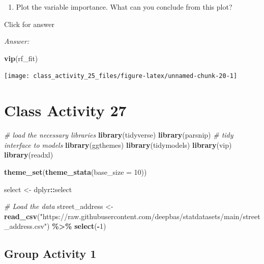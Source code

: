 \documentclass[
]{book}
\newenvironment{Shaded}{\begin{snugshade}}{\end{snugshade}}
\newcommand{\AttributeTok}[1]{\textcolor[rgb]{0.13,0.29,0.53}{#1}}
\newcommand{\CommentTok}[1]{\textcolor[rgb]{0.56,0.35,0.01}{\textit{#1}}}
\newcommand{\DecValTok}[1]{\textcolor[rgb]{0.00,0.00,0.81}{#1}}
\newcommand{\FunctionTok}[1]{\textcolor[rgb]{0.13,0.29,0.53}{\textbf{#1}}}
\newcommand{\NormalTok}[1]{#1}
\newcommand{\OtherTok}[1]{\textcolor[rgb]{0.56,0.35,0.01}{#1}}
\newcommand{\SpecialCharTok}[1]{\textcolor[rgb]{0.81,0.36,0.00}{\textbf{#1}}}
\newcommand{\StringTok}[1]{\textcolor[rgb]{0.31,0.60,0.02}{#1}}
\providecommand{\tightlist}{%
  \setlength{\itemsep}{0pt}\setlength{\parskip}{0pt}}
\begin{document}
\begin{enumerate}
\def\labelenumi{\alph{enumi}.}
\setcounter{enumi}{6}
\tightlist
\item
  Plot the variable importance. What can you conclude from this plot?
\end{enumerate}

Click for answer

\emph{Answer:}

\begin{Shaded}
\begin{Highlighting}[]
\FunctionTok{vip}\NormalTok{(rf\_fit)}
\end{Highlighting}
\end{Shaded}

\texttt{[image: class\_activity\_25\_files/figure-latex/unnamed-chunk-20-1]}

\hypertarget{class-activity-27}{%
\chapter{Class Activity 27}\label{class-activity-27}}

\begin{Shaded}
\begin{Highlighting}[]
\CommentTok{\# load the necessary libraries}
\FunctionTok{library}\NormalTok{(tidyverse) }
\FunctionTok{library}\NormalTok{(parsnip) }\CommentTok{\# tidy interface to models}
\FunctionTok{library}\NormalTok{(ggthemes)}
\FunctionTok{library}\NormalTok{(tidymodels)}
\FunctionTok{library}\NormalTok{(vip)}
\FunctionTok{library}\NormalTok{(readxl)}

\FunctionTok{theme\_set}\NormalTok{(}\FunctionTok{theme\_stata}\NormalTok{(}\AttributeTok{base\_size =} \DecValTok{10}\NormalTok{))}

\NormalTok{select }\OtherTok{\textless{}{-}}\NormalTok{ dplyr}\SpecialCharTok{::}\NormalTok{select}

\CommentTok{\# Load the data}
\NormalTok{street\_address }\OtherTok{\textless{}{-}} \FunctionTok{read\_csv}\NormalTok{(}\StringTok{"https://raw.githubusercontent.com/deepbas/statdatasets/main/street\_address.csv"}\NormalTok{) }\SpecialCharTok{\%\textgreater{}\%}  \FunctionTok{select}\NormalTok{(}\SpecialCharTok{{-}}\DecValTok{1}\NormalTok{)}
\end{Highlighting}
\end{Shaded}

\hypertarget{group-activity-1-11}{%
\section{Group Activity 1}\label{group-activity-1-11}}
\end{document}
